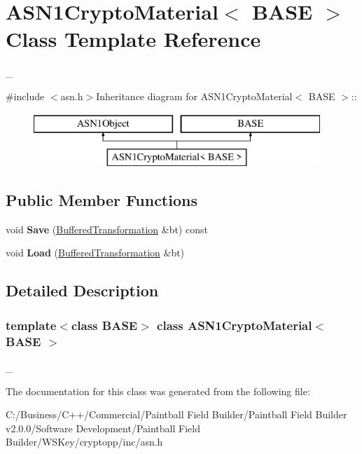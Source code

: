 \hypertarget{class_a_s_n1_crypto_material}{
\section{ASN1CryptoMaterial$<$ BASE $>$ Class Template Reference}
\label{class_a_s_n1_crypto_material}
}


\_\-  


{\ttfamily \#include $<$asn.h$>$}Inheritance diagram for ASN1CryptoMaterial$<$ BASE $>$::\begin{figure}[H]
\begin{center}
\leavevmode
\includegraphics[height=2cm]{class_a_s_n1_crypto_material}
\end{center}
\end{figure}
\subsection*{Public Member Functions}
\begin{DoxyCompactItemize}
\item 
\hypertarget{class_a_s_n1_crypto_material_a8092ce7a774430f54c70632812ce3399}{
void {\bfseries Save} (\hyperlink{class_buffered_transformation}{BufferedTransformation} \&bt) const }
\label{class_a_s_n1_crypto_material_a8092ce7a774430f54c70632812ce3399}

\item 
\hypertarget{class_a_s_n1_crypto_material_a23d34a094f5765a1cf51f22ae1233f66}{
void {\bfseries Load} (\hyperlink{class_buffered_transformation}{BufferedTransformation} \&bt)}
\label{class_a_s_n1_crypto_material_a23d34a094f5765a1cf51f22ae1233f66}

\end{DoxyCompactItemize}


\subsection{Detailed Description}
\subsubsection*{template$<$class BASE$>$ class ASN1CryptoMaterial$<$ BASE $>$}

\_\- 

The documentation for this class was generated from the following file:\begin{DoxyCompactItemize}
\item 
C:/Business/C++/Commercial/Paintball Field Builder/Paintball Field Builder v2.0.0/Software Development/Paintball Field Builder/WSKey/cryptopp/inc/asn.h\end{DoxyCompactItemize}
